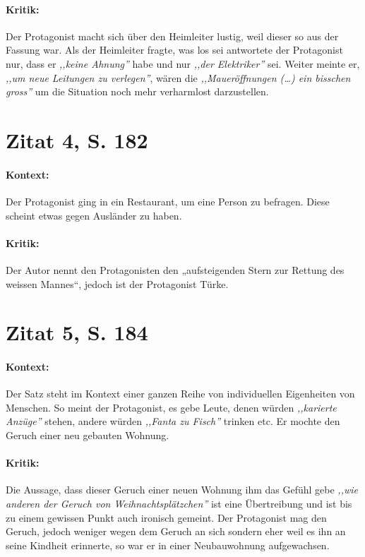 \documentclass[12pt,twoside,a4paper,twocolumn]{article}
\begin{document}
	\paragraph{Kritik:} Der Protagonist macht sich über den Heimleiter lustig, weil dieser so aus der Fassung war. Als der Heimleiter fragte, was los sei antwortete der Protagonist nur, dass er \textit{,,keine Ahnung''} habe und nur \textit{,,der Elektriker''} sei. Weiter meinte er, \textit{,,um neue Leitungen zu verlegen''}, wären die \textit{,,Maueröffnungen (\dots) ein bisschen gross''} um die Situation noch mehr verharmlost darzustellen.
	
	\section{Zitat 4, S. 182}
	
	\paragraph{Kontext:} Der Protagonist ging in ein Restaurant, um eine Person zu befragen. Diese scheint etwas gegen Ausländer zu haben. 
	
	
	\paragraph{Kritik:} Der Autor  nennt den Protagonisten den „aufsteigenden Stern zur Rettung des weissen Mannes“, jedoch ist der Protagonist Türke.
	
		

	\section{Zitat 5, S. 184}
	
	\paragraph{Kontext:} Der Satz steht im Kontext einer ganzen Reihe von individuellen Eigenheiten von Menschen. So meint der Protagonist, es gebe Leute, denen würden \textit{,,karierte Anzüge''} stehen, andere würden \textit{,,Fanta zu Fisch''} trinken etc. Er mochte den Geruch einer neu gebauten Wohnung.
	
	\paragraph{Kritik:} Die Aussage, dass dieser Geruch einer neuen Wohnung ihm das Gefühl gebe \textit{,,wie anderen der Geruch von Weihnachtsplätzchen''} ist eine Übertreibung und ist bis zu einem gewissen Punkt auch ironisch gemeint. Der Protagonist mag den Geruch, jedoch weniger wegen dem Geruch an sich sondern eher weil es ihn an seine Kindheit erinnerte, so war er in einer Neubauwohnung aufgewachsen.
	
\end{document}
